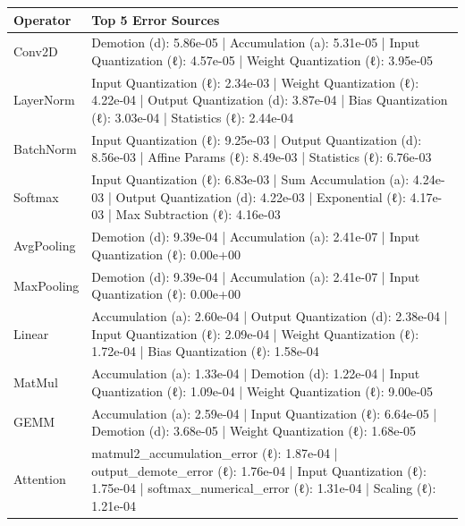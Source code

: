 \caption{Top 5 error sources per operator with 3-component classification. Each entry shows the error source, its component ($\ell$: Storage Linear, $a$: Accumulation, $d$: Demotion), and absolute magnitude. The decomposition follows Equations~\ref{eq:linear_contribution}-\ref{eq:total_contribution}.}
\label{tab:contribution_detailed}
\begin{tabular}{l p{12cm}}
\toprule
Operator & Top 5 Error Sources \\
\midrule
Conv2D & Demotion (d): 5.86e-05 | Accumulation (a): 5.31e-05 | Input Quantization (ℓ): 4.57e-05 | Weight Quantization (ℓ): 3.95e-05 \\
LayerNorm & Input Quantization (ℓ): 2.34e-03 | Weight Quantization (ℓ): 4.22e-04 | Output Quantization (d): 3.87e-04 | Bias Quantization (ℓ): 3.03e-04 | Statistics (ℓ): 2.44e-04 \\
BatchNorm & Input Quantization (ℓ): 9.25e-03 | Output Quantization (d): 8.56e-03 | Affine Params (ℓ): 8.49e-03 | Statistics (ℓ): 6.76e-03 \\
Softmax & Input Quantization (ℓ): 6.83e-03 | Sum Accumulation (a): 4.24e-03 | Output Quantization (d): 4.22e-03 | Exponential (ℓ): 4.17e-03 | Max Subtraction (ℓ): 4.16e-03 \\
AvgPooling & Demotion (d): 9.39e-04 | Accumulation (a): 2.41e-07 | Input Quantization (ℓ): 0.00e+00 \\
MaxPooling & Demotion (d): 9.39e-04 | Accumulation (a): 2.41e-07 | Input Quantization (ℓ): 0.00e+00 \\
Linear & Accumulation (a): 2.60e-04 | Output Quantization (d): 2.38e-04 | Input Quantization (ℓ): 2.09e-04 | Weight Quantization (ℓ): 1.72e-04 | Bias Quantization (ℓ): 1.58e-04 \\
MatMul & Accumulation (a): 1.33e-04 | Demotion (d): 1.22e-04 | Input Quantization (ℓ): 1.09e-04 | Weight Quantization (ℓ): 9.00e-05 \\
GEMM & Accumulation (a): 2.59e-04 | Input Quantization (ℓ): 6.64e-05 | Demotion (d): 3.68e-05 | Weight Quantization (ℓ): 1.68e-05 \\
Attention & matmul2_accumulation_error (ℓ): 1.87e-04 | output_demote_error (ℓ): 1.76e-04 | Input Quantization (ℓ): 1.75e-04 | softmax_numerical_error (ℓ): 1.31e-04 | Scaling (ℓ): 1.21e-04 \\
\bottomrule
\end{tabular}
